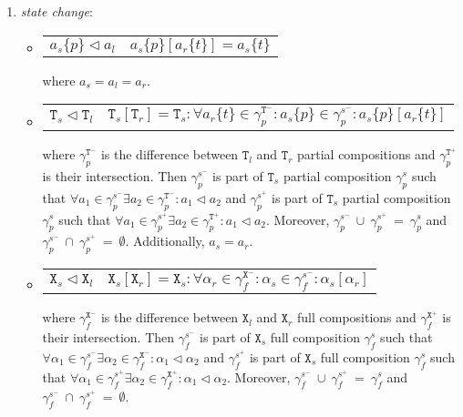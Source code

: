 \documentclass[12pt]{article}
\begin{document}
\begin{enumerate}
\item \textit{state change}:

\begin{itemize}
\item	\begin{tabular}{ l l }
				$ a_s\{p\} \lhd a_l $ & \hspace*{0.6cm} $ a_s\{p\}[a_r\{t\}] = a_s\{t\} $
		\end{tabular}
	  
where $ a_s = a_l = a_r $.
\item   \begin{tabular}{ l l }
				$ \mathtt{T}_s \lhd \mathtt{T}_l $ & \hspace*{1cm} $ \mathtt{T}_s[\mathtt{T}_r] = \mathtt{T}_s: \forall a_r\{t\} \in \gamma^{\mathtt{T}^-}_{p}: a_s\{p\} \in \gamma^{s^-}_{p}: a_s\{p\}[a_r\{t\}] $
		\end{tabular}

where $\gamma^{\mathtt{T}^-}_{p}$ is the difference between $\mathtt{T}_l$ and $\mathtt{T}_r$ partial compositions and $\gamma^{\mathtt{T}^+}_{p}$ is their intersection. Then $\gamma^{s^-}_{p}$ is part of $\mathtt{T}_s$ partial composition $\gamma^{s}_{p}$ such that $\forall a_1 \in \gamma^{s^-}_{p} \exists a_2 \in \gamma^{\mathtt{T}^-}_{p}: a_1 \lhd a_2 $ and $\gamma^{s^+}_{p}$ is part of $\mathtt{T}_s$ partial composition $\gamma^{s}_{p}$ such that $\forall a_1 \in \gamma^{s^+}_{p} \exists a_2 \in \gamma^{\mathtt{T}^+}_{p}: a_1 \lhd a_2 $. Moreover, $\gamma^{s^-}_{p}~\cup~\gamma^{s^+}_{p}~=~\gamma^{s}_{p}$ and $\gamma^{s^-}_{p}~\cap~\gamma^{s^+}_{p}~=~\emptyset$. Additionally, $ a_s = a_r $.

\item   \begin{tabular}{ l l }
			$ \mathtt{X}_s \lhd \mathtt{X}_l $ & \hspace*{1cm} $ \mathtt{X}_s[\mathtt{X}_r] = \mathtt{X}_s: \forall \alpha_r \in \gamma^{\mathtt{X}^-}_{f}: \alpha_s \in \gamma^{s^-}_{f} : \alpha_s[\alpha_r] $
		\end{tabular}

where $\gamma^{\mathtt{X}^-}_{f}$ is the difference between $\mathtt{X}_l$ and $\mathtt{X}_r$ full compositions and $\gamma^{\mathtt{X}^+}_{f}$ is their intersection. Then $\gamma^{s^-}_{f}$ is part of $\mathtt{X}_s$ full composition $\gamma^{s}_{f}$ such that $\forall \alpha_1 \in \gamma^{s^-}_{f} \exists \alpha_2 \in \gamma^{\mathtt{X}^-}_{f}: \alpha_1 \lhd \alpha_2 $ and $\gamma^{s^+}_{f}$ is part of $\mathtt{X}_s$ full composition $\gamma^{s}_{f}$ such that $\forall \alpha_1 \in \gamma^{s^+}_{f} \exists \alpha_2 \in \gamma^{\mathtt{X}^+}_{f}: \alpha_1 \lhd \alpha_2 $. Moreover, $\gamma^{s^-}_{f}~\cup~\gamma^{s^+}_{f}~=~\gamma^{s}_{f}$ and $\gamma^{s^-}_{f}~\cap~\gamma^{s^+}_{f}~=~\emptyset$. 


\end{itemize}
\end{enumerate}
\end{document}
